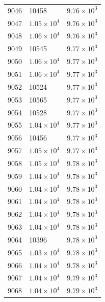 \begin{table}[H]
\begin{tabular}{lll}
9046 & 10458 & $\displaystyle 9.76 \times 10^{3}$ \\
9047 & $\displaystyle 1.05 \times 10^{4}$ & $\displaystyle 9.76 \times 10^{3}$ \\
9048 & $\displaystyle 1.06 \times 10^{4}$ & $\displaystyle 9.76 \times 10^{3}$ \\
9049 & 10545 & $\displaystyle 9.77 \times 10^{3}$ \\
9050 & $\displaystyle 1.06 \times 10^{4}$ & $\displaystyle 9.77 \times 10^{3}$ \\
9051 & $\displaystyle 1.06 \times 10^{4}$ & $\displaystyle 9.77 \times 10^{3}$ \\
9052 & 10524 & $\displaystyle 9.77 \times 10^{3}$ \\
9053 & 10565 & $\displaystyle 9.77 \times 10^{3}$ \\
9054 & 10528 & $\displaystyle 9.77 \times 10^{3}$ \\
9055 & $\displaystyle 1.04 \times 10^{4}$ & $\displaystyle 9.77 \times 10^{3}$ \\
9056 & 10456 & $\displaystyle 9.77 \times 10^{3}$ \\
9057 & $\displaystyle 1.05 \times 10^{4}$ & $\displaystyle 9.77 \times 10^{3}$ \\
9058 & $\displaystyle 1.05 \times 10^{4}$ & $\displaystyle 9.78 \times 10^{3}$ \\
9059 & $\displaystyle 1.04 \times 10^{4}$ & $\displaystyle 9.78 \times 10^{3}$ \\
9060 & $\displaystyle 1.04 \times 10^{4}$ & $\displaystyle 9.78 \times 10^{3}$ \\
9061 & $\displaystyle 1.04 \times 10^{4}$ & $\displaystyle 9.78 \times 10^{3}$ \\
9062 & $\displaystyle 1.04 \times 10^{4}$ & $\displaystyle 9.78 \times 10^{3}$ \\
9063 & $\displaystyle 1.04 \times 10^{4}$ & $\displaystyle 9.78 \times 10^{3}$ \\
9064 & 10396 & $\displaystyle 9.78 \times 10^{3}$ \\
9065 & $\displaystyle 1.03 \times 10^{4}$ & $\displaystyle 9.78 \times 10^{3}$ \\
9066 & $\displaystyle 1.04 \times 10^{4}$ & $\displaystyle 9.78 \times 10^{3}$ \\
9067 & $\displaystyle 1.04 \times 10^{4}$ & $\displaystyle 9.79 \times 10^{3}$ \\
9068 & $\displaystyle 1.04 \times 10^{4}$ & $\displaystyle 9.79 \times 10^{3}$ \\

\end{tabular}
\end{table}
